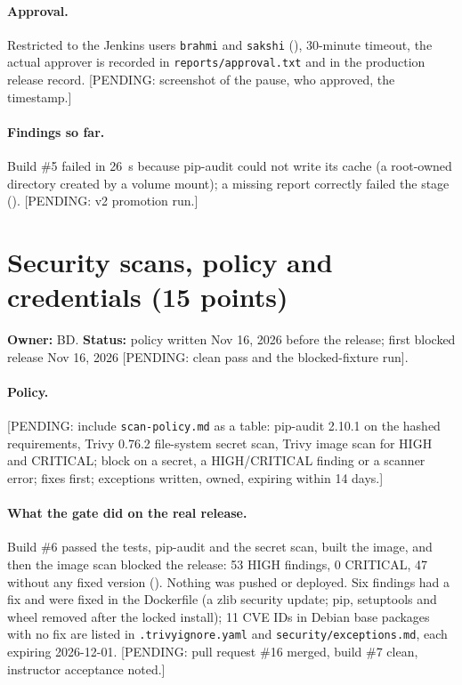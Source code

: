 \paragraph{Approval.} Restricted to the Jenkins users \texttt{brahmi} and \texttt{sakshi} (), 30-minute timeout, the actual approver is
recorded in \texttt{reports/approval.txt} and in the production release record. [PENDING: screenshot of the pause, who approved, the timestamp.]

\paragraph{Findings so far.} Build \#5 failed in 26~s because pip-audit could not write its cache (a root-owned directory created by a volume mount);
a missing report correctly failed the stage (). [PENDING: v2 promotion run.]

\section{Security scans, policy and credentials (15 points)}\label{Section:deliveryScans}
\textbf{Owner:} BD. \textbf{Status:} policy written Nov 16, 2026 before the release; first blocked release Nov 16, 2026 [PENDING: clean pass and the blocked-fixture run].

\paragraph{Policy.} [PENDING: include \texttt{scan-policy.md} as a table: pip-audit 2.10.1 on the hashed requirements, Trivy 0.76.2 file-system secret scan,
Trivy image scan for HIGH and CRITICAL; block on a secret, a HIGH/CRITICAL finding or a scanner error; fixes first; exceptions written, owned, expiring within 14 days.]

\paragraph{What the gate did on the real release.} Build \#6 passed the tests, pip-audit and the secret scan, built the image, and then the image scan
blocked the release: 53 HIGH findings, 0 CRITICAL, 47 without any fixed version (). Nothing was pushed or deployed. Six findings had a fix and were fixed in the
Dockerfile (a zlib security update; pip, setuptools and wheel removed after the locked install); 11 CVE IDs in Debian base packages with no fix are listed in
\texttt{.trivyignore.yaml} and \texttt{security/exceptions.md}, each expiring 2026-12-01. [PENDING: pull request \#16 merged, build \#7 clean, instructor acceptance noted.]

